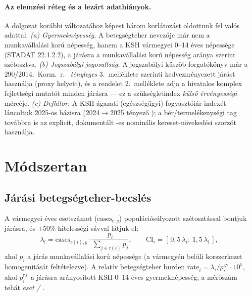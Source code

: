 \documentclass[12pt,a4paper]{article}
\begin{document}
\paragraph{Az elemzési réteg és a lezárt adathiányok.}
A dolgozat korábbi változatához képest három korlátozást oldottunk fel valós
adattal. \emph{(a) Gyermeknépesség.} A betegségteher nevezője már nem a
munkavállalási korú népesség, hanem a KSH vármegyei 0--14 éves népessége
(STADAT 22.1.2.2), a járásra a munkavállalási korú népesség aránya szerint
szétosztva. \emph{(b) Jogszabályi jogosultság.} A jogszabályi
küszöb-forgatókönyv már a 290/2014.~Korm.~r.\ \citep{korm2902014}
\emph{tényleges} 3.~melléklete szerinti \nEligibleProxy{} kedvezményezett
járást használja (proxy helyett), és a rendelet 2.~melléklete adja a
hivatalos komplex fejlettségi mutatót minden járásra --- ez a szükségletindex
\emph{külső érvényességi} mércéje. \emph{(c) Deflátor.} A KSH ágazati
(egészségügyi) fogyasztóiár-indexét láncoltuk 2025-ös bázisra
(2024$\to$2025 tényező ); a bér/termelékenységi tag továbbra is az
explicit, dokumentált \earningsDefl-es nominális kereset-növekedési szorzót
használja.

\section{Módszertan}

\subsection{Járási betegségteher-becslés}
A vármegyei éves esetszámot ($\mathrm{cases}_{c,y}$) populációsúlyozott
szétosztással bontjuk járásra, és $\pm 50\%$ hitelességi sávval látjuk el:
\begin{equation}
\lambda_i = \mathrm{cases}_{c(i),y}\cdot
  \frac{p_i}{\sum_{j\in c(i)} p_j},\qquad
\mathrm{CI}_i = [\,0{,}5\,\lambda_i;\ 1{,}5\,\lambda_i\,],
\end{equation}
ahol $p_i$ a járás munkavállalási korú népessége (a vármegyén belüli
korszerkezet homogenitását feltételezve). A relatív betegségteher
$\mathrm{burden\_rate}_i = \lambda_i / p^{\text{gy}}_i \cdot 10^5$, ahol
$p^{\text{gy}}_i$ a járásra arányosított KSH 0--14 éves gyermeknépesség; a
mérőszám tehát \emph{eset / \rateDenom{}}.
\end{document}
